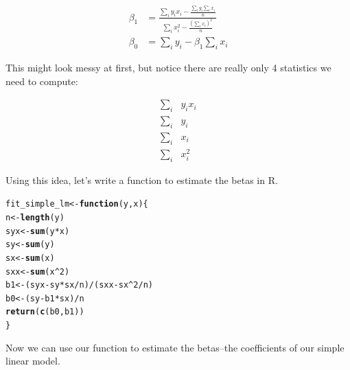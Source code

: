 \documentclass[10pt]{article}\usepackage[]{graphicx}\usepackage[]{color}
\makeatletter
\newcommand{\hlnum}[1]{\textcolor[rgb]{0.686,0.059,0.569}{#1}}%
\newcommand{\hlopt}[1]{\textcolor[rgb]{0,0,0}{#1}}%
\newcommand{\hlstd}[1]{\textcolor[rgb]{0.345,0.345,0.345}{#1}}%
\newcommand{\hlkwa}[1]{\textcolor[rgb]{0.161,0.373,0.58}{\textbf{#1}}}%
\newcommand{\hlkwb}[1]{\textcolor[rgb]{0.69,0.353,0.396}{#1}}%
\newcommand{\hlkwc}[1]{\textcolor[rgb]{0.333,0.667,0.333}{#1}}%
\newcommand{\hlkwd}[1]{\textcolor[rgb]{0.737,0.353,0.396}{\textbf{#1}}}%
\newenvironment{kframe}{%
 \def\at@end@of@kframe{}%
 \ifinner\ifhmode%
  \def\at@end@of@kframe{\end{minipage}}%
  \begin{minipage}{\columnwidth}%
 \fi\fi%
 \def\FrameCommand##1{\hskip\@totalleftmargin \hskip-\fboxsep
 \colorbox{shadecolor}{##1}\hskip-\fboxsep
     \hskip-\linewidth \hskip-\@totalleftmargin \hskip\columnwidth}%
 \MakeFramed {\advance\hsize-\width
   \@totalleftmargin\z@ \linewidth\hsize
   \@setminipage}}%
 {\par\unskip\endMakeFramed%
 \at@end@of@kframe}
\newenvironment{knitrout}{}{} %
\makeatother
\begin{document}
\begin{align}
\beta_1 &= \frac{ \sum_i y_i x_i - \frac{\sum_i y_i \sum_i x_i}{n} }{ \sum_i x_i^2 - \frac{(\sum_i x_i)^2}{n} } \\
\beta_0 &=  \sum_i y_i - \beta_1 \sum_i x_i 
\end{align}

This might look messy at first, but notice there are really only 4 statistics we need to compute: 

\begin{align}
\sum_i & y_i x_i \\
\sum_i & y_i \\
\sum_i & x_i \\
\sum_i & x_i^2
\end{align}

Using this idea, let's write a function to estimate the betas in R. 

\begin{knitrout}\small
{}\color{fgcolor}\begin{kframe}
\begin{alltt}
\hlstd{fit_simple_lm}\hlkwb{<-}\hlkwa{function}\hlstd{(}\hlkwc{y}\hlstd{,}\hlkwc{x}\hlstd{)\{}
  \hlstd{n}\hlkwb{<-}\hlkwd{length}\hlstd{(y)}
  \hlstd{syx}\hlkwb{<-}\hlkwd{sum}\hlstd{(y}\hlopt{*}\hlstd{x)}
  \hlstd{sy}\hlkwb{<-}\hlkwd{sum}\hlstd{(y)}
  \hlstd{sx}\hlkwb{<-}\hlkwd{sum}\hlstd{(x)}
  \hlstd{sxx}\hlkwb{<-}\hlkwd{sum}\hlstd{(x}\hlopt{^}\hlnum{2}\hlstd{)}
  \hlstd{b1}\hlkwb{<-} \hlstd{(syx} \hlopt{-} \hlstd{sy}\hlopt{*}\hlstd{sx}\hlopt{/}\hlstd{n)}\hlopt{/}\hlstd{(sxx} \hlopt{-} \hlstd{sx}\hlopt{^}\hlnum{2}\hlopt{/}\hlstd{n)}
  \hlstd{b0}\hlkwb{<-} \hlstd{(sy} \hlopt{-} \hlstd{b1}\hlopt{*}\hlstd{sx)}\hlopt{/}\hlstd{n}
  \hlkwd{return}\hlstd{(}\hlkwd{c}\hlstd{(b0,b1))}
\hlstd{\}}
\end{alltt}
\end{kframe}
\end{knitrout}

Now we can use our function to estimate the betas--the coefficients of our simple linear model.
\end{document}
